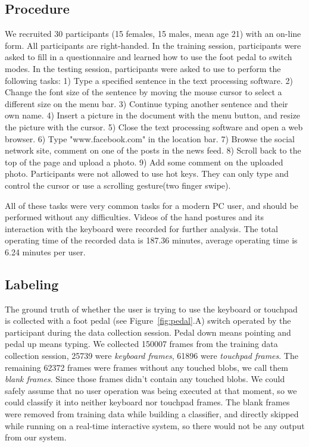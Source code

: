 \subsection{Procedure}
We recruited 30 participants (15 females, 15 males, mean age 21) with an on-line form.
All participants are right-handed.
In the training session, participants were asked to fill in a questionnaire and learned how to use the foot pedal to switch modes.
In the testing session, participants were asked to use \papertitle\hspace{2pt} to perform the following tasks: 
1) Type a specified sentence in the text processing software.
2) Change the font size of the sentence by moving the mouse cursor to select a different size on the menu bar.
3) Continue typing another sentence and their own name.
4) Insert a picture in the document with the menu button, and resize the picture with the cursor.
5) Close the text processing software and open a web browser.
6) Type "www.facebook.com" in the location bar.
7) Browse the social network site, comment on one of the posts in the news feed.
8) Scroll back to the top of the page and upload a photo.
9) Add some comment on the uploaded photo. Participants were not allowed to use hot keys. They can only type and control the cursor or use a scrolling gesture(two finger swipe).

All of these tasks were very common tasks for a modern PC user, and should be performed without any difficulties.
Videos of the hand postures and its interaction with the keyboard were recorded for further analysis.
The total operating time of the recorded data is 187.36 minutes, average operating time is 6.24 minutes per user.

\subsection{Labeling}
The ground truth of whether the user is trying to use the keyboard or touchpad is collected with a foot pedal (see Figure~\ref{fig:pedal}.A) switch operated by the participant during the data collection session. Pedal down means pointing and pedal up means typing.
We collected 150007 frames from the training data collection session, 25739 were \emph{keyboard frames}, 61896 were \emph{touchpad frames}.
The remaining 62372 frames were frames without any touched blobs, we call them \emph{blank frames}.
Since those frames didn't contain any touched blobs. We could safely assume that no user operation was being executed at that moment, so we could classify it into neither keyboard nor touchpad frames.
The blank frames were removed from training data while building a classifier, and directly skipped while running on a real-time interactive system, so there would not be any output from our system.

